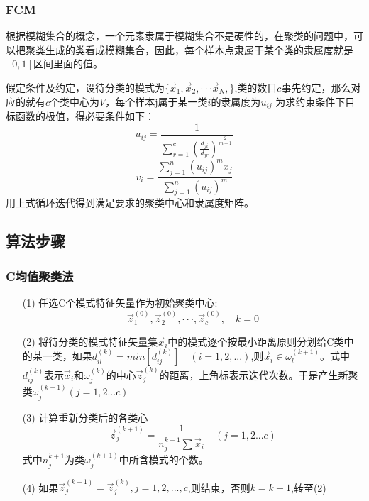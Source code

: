 \documentclass{article}
\begin{document}
\subsubsection{FCM}
根据模糊集合的概念，一个元素隶属于模糊集合不是硬性的，在聚类的问题中，可以把聚类生成的类看成模糊集合，因此，每个样本点隶属于某个类的隶属度就是$[0,1]$区间里面的值。

假定条件及约定，设待分类的模式为$\{\Vec{x}_1,\Vec{x}_2,···\Vec{x}_N,\}$,类的数目$c$事先约定，那么对应的就有$c$个类中心为$V$，每个样本j属于某一类$i$的隶属度为$u_{ij}$
为求约束条件下目标函数的极值，得必要条件如下：
\begin{equation}
    u_{ij} = \frac{1}{\sum\limits_{r=1}^{c}(\frac{d_{ji}}{d_{jr}})^{\frac{2}{m-1}}}
    \label{1}
\end{equation}
\begin{equation}
    v_{i} = \frac{\sum\limits_{j=1}^{n}(u_{ij})^m x_j}{\sum\limits_{j=1}^{n}(u_{ij})^m}
    \label{2}
\end{equation}
用上式循环迭代得到满足要求的聚类中心和隶属度矩阵。
\subsection{算法步骤}
\subsubsection{C均值聚类法}
\begin{enumerate}
    \item[(1)] 任选C个模式特征矢量作为初始聚类中心:\[
    \Vec{z}_1^{(0)},\Vec{z}_2^{(0)},···,\Vec{z}_c^{(0)}, \quad k=0
    \]
    \item[(2)] 将待分类的模式特征矢量集$\Vec{x}_i$中的模式逐个按最小距离原则分划给C类中的某一类，如果$d_{il}^{(k)} = min[d_{ij}^{(k)}] \quad (i = 1,2,...)$,则$\Vec{x}_i\in \omega_l^{(k+1)}$。式中$d_{ij}^{(k)}$表示$\Vec{x}_i$和$\omega_j^{(k)}$的中心$\Vec{z}_j^{(k)}$的距离，上角标表示迭代次数。于是产生新聚类$\omega_j^{(k+1)} (j = 1,2...c)$
    \item[(3)] 计算重新分类后的各类心\[
    \Vec{z}_j^{(k+1)} = \frac{1}{n_j^{k+1}\sum\Vec{x}_i} \quad (j = 1,2...c)
    \]
    式中$n_j^{k+1}$为类$\omega_j^{(k+1)}$中所含模式的个数。
    \item[(4)] 如果$\Vec{z}_j^{(k+1)} = \Vec{z}_j^{(k)},j = 1,2,...,c$,则结束，否则$k = k+1$,转至(2)
\end{enumerate}
\end{document}
